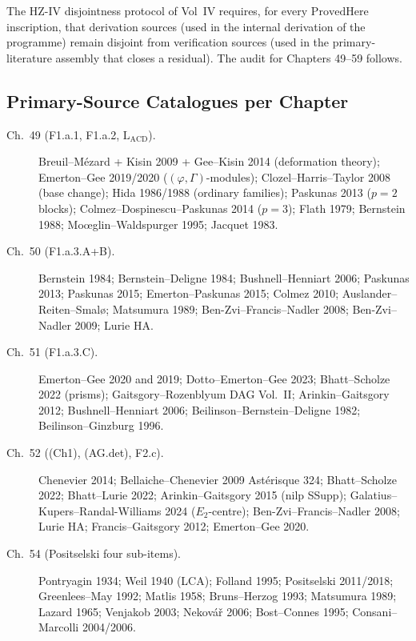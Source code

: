 The HZ-IV disjointness protocol of Vol~IV requires, for every
\(\mathrm{ProvedHere}\) inscription, that derivation sources (used
in the internal derivation of the programme) remain disjoint from
verification sources (used in the primary-literature assembly that
closes a residual). The audit for Chapters 49--59 follows.

\subsection{Primary-Source Catalogues per Chapter}
\label{v4-arith:w5-synth:catalogues}

\begin{description}
\item[Ch.~49 (F1.a.1, F1.a.2, \(\mathrm{L}_{\mathrm{ACD}}\)).]
Breuil--M{\'e}zard + Kisin 2009 + Gee--Kisin 2014 (deformation
theory); Emerton--Gee 2019/2020 (\((\varphi,\Gamma)\)-modules);
Clozel--Harris--Taylor 2008 (base change); Hida 1986/1988
(ordinary families); Paskunas 2013 (\(p=2\) blocks);
Colmez--Dospinescu--Paskunas 2014 (\(p=3\)); Flath 1979; Bernstein
1988; Mo{\oe}glin--Waldspurger 1995; Jacquet 1983.

\item[Ch.~50 (F1.a.3.A+B).] Bernstein 1984; Bernstein--Deligne
1984; Bushnell--Henniart 2006; Paskunas 2013; Paskunas 2015;
Emerton--Paskunas 2015; Colmez 2010; Auslander--Reiten--Smal\o{};
Matsumura 1989; Ben-Zvi--Francis--Nadler 2008; Ben-Zvi--Nadler
2009; Lurie HA.

\item[Ch.~51 (F1.a.3.C).] Emerton--Gee 2020 and 2019;
Dotto--Emerton--Gee 2023; Bhatt--Scholze 2022 (prisms);
Gaitsgory--Rozenblyum DAG Vol.~II; Arinkin--Gaitsgory 2012;
Bushnell--Henniart 2006; Beilinson--Bernstein--Deligne 1982;
Beilinson--Ginzburg 1996.

\item[Ch.~52 ((Ch1), (AG.det), F2.c).]
Chenevier 2014; Bellaiche--Chenevier 2009
Ast\'erisque 324; Bhatt--Scholze 2022; Bhatt--Lurie 2022;
Arinkin--Gaitsgory 2015 (nilp SSupp);
Galatius--Kupers--Randal-Williams 2024 (\(E_{2}\)-centre);
Ben-Zvi--Francis--Nadler 2008; Lurie HA;
Francis--Gaitsgory 2012; Emerton--Gee 2020.

\item[Ch.~54 (Positselski four sub-items).] Pontryagin 1934;
Weil 1940 (LCA); Folland 1995; Positselski 2011/2018;
Greenlees--May 1992; Matlis 1958; Bruns--Herzog 1993;
Matsumura 1989; Lazard 1965; Venjakob 2003; Nekov\'a\v{r} 2006;
Bost--Connes 1995; Consani--Marcolli 2004/2006.


\end{description}
